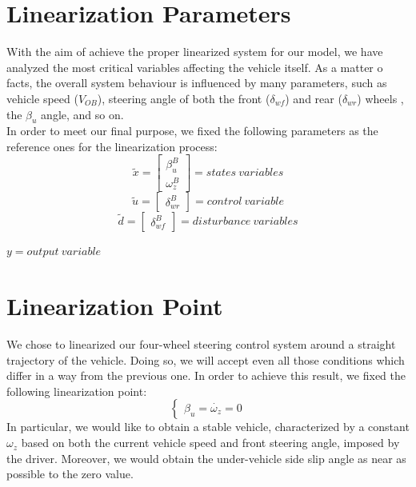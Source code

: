 \section{Linearization Parameters}
	With the aim of achieve the proper linearized system for our model, we have analyzed the most critical variables affecting the vehicle itself. As a matter o facts, the overall system behaviour is influenced by many parameters, such as vehicle speed ($V_{OB}$), steering angle of both the front ($\delta_{wf}$) and rear ($\delta_{wr}$) wheels , the $\beta_{u}$ angle, and so on. \\
	In order to meet our final purpose, we fixed the following parameters as the reference ones for the linearization process:\\
		\begin{equation*}
			\tilde{x} =
			\begin{bmatrix}
			\beta_{u}^{B} \\\omega_{z}^{B}
			\end{bmatrix} = states \ variables
		\end{equation*}\quad
		\begin{equation*}
			\tilde{u} =
			\begin{bmatrix}
			\delta_{wr}^{B}
			\end{bmatrix} = control \ variable
		\end{equation*}\quad
		\begin{equation*}
			\tilde{d} =
			\begin{bmatrix}
			\delta_{wf}^{B}
			\end{bmatrix} = disturbance \ variables
		\end{equation*}
		\begin{center}
			$ y = output \ variable $
		\end{center}
\section{Linearization Point}
	We chose to linearized our four-wheel steering control system around a straight trajectory of the vehicle. Doing so, we will accept even all those conditions which differ in a way from the previous one. In order to achieve this result, we fixed the following linearization point:
		\begin{equation*}
			\begin{cases}
			\beta_{u} = \dot{\omega_{z}} = 0
			\end{cases}
		\end{equation*}
	In particular, we would like to obtain a stable vehicle, characterized by a constant $\omega_{z}$ based on both the current vehicle speed and front steering angle, imposed by the driver. Moreover, we would obtain the under-vehicle side slip angle as near as possible to the zero value.
